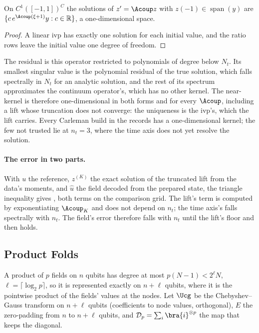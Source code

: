 \begin{proposition}
\label{prop:ivp-uniqueness}
On $C^1([-1,1])^C$ the solutions of $z'=\Acoup z$ with $z(-1)\in\operatorname{span}(y)$ are $\{c\,e^{\Acoup(\xi+1)}y:c\in\mathbb{R}\}$, a one-dimensional space.
\end{proposition}
\begin{proof}
A linear \gls{ivp} has exactly one solution for each initial value, and the ratio rows leave the initial value one degree of freedom.
\end{proof}
The residual is this operator restricted to polynomials of degree below $N_t$. Its smallest singular value is the polynomial residual of the true solution, which falls spectrally in $N_t$ for an analytic solution, and the rest of its spectrum approximates the continuum operator's, which has no other kernel. The near-kernel is therefore one-dimensional in both forms and for every $\Acoup$, including a lift whose truncation does not converge: the uniqueness is the \gls{ivp}'s, which the lift carries. Every Carleman build in the records has a one-dimensional kernel; the few not trusted lie at $n_t=3$, where the time axis does not yet resolve the solution.

\paragraph{The error in two parts.} With $u$ the reference, $z^{(K)}$ the exact solution of the truncated lift from the data's moments, and $\hat u$ the field decoded from the prepared state, the triangle inequality gives , both terms on the comparison grid. The lift's term is computed by exponentiating $\Acoup_K$ and does not depend on $n_t$; the time axis's falls spectrally with $n_t$. The field's error therefore falls with $n_t$ until the lift's floor and then holds.

\subsection{Product Folds}
\label{app:proof-fold-optimal}

A product of $p$ fields on $n$ qubits has degree at most $p(N-1)<2^\ell N$, $\ell=\lceil\log_2p\rceil$, so it is represented exactly on $n+\ell$ qubits, where it is the pointwise product of the fields' values at the nodes. Let $\Ucg$ be the Chebyshev--Gauss transform on $n+\ell$ qubits (coefficients to node values, orthogonal), $E$ the zero-padding from $n$ to $n+\ell$ qubits, and $\mathcal{D}_p=\sum_i\bra{i}^{\otimes p}$ the map that keeps the diagonal.

